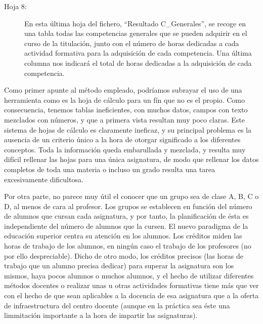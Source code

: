 \begin{description}
			\item[Hoja 8:] En esta última hoja del fichero, "`Resultado C\_Generales"', se	recoge en una tabla todas las competencias generales que se pueden adquirir en el curso de la titulación, junto con el número de horas dedicadas a cada actividad formativa para la adquisición de cada competencia. Una última columna	nos indicará el total de horas dedicadas a la adquisición de cada competencia.
		\end{description}

		Como primer apunte al método empleado, podríamos subrayar el uso de una herramienta como es la hoja de cálculo para un fín que no es el propio. Como consecuencia, tenemos tablas ineficientes, con muchos datos, campos con texto mezclados con números, y que a primera vista resultan muy poco claras. Este sistema de hojas de cálculo es claramente ineficaz, y su principal problema es la ausencia de un criterio único a la hora de otorgar significado a los diferentes conceptos. Toda la información queda embarullada y mezclada, y resulta muy difícil rellenar las hojas para una única asignatura, de modo que rellenar los datos completos de toda una materia o incluso un grado resulta una tarea excesivamente dificultosa.
     
		Por otra parte, no parece muy útil el conocer que un grupo sea de clase A, B, C o D, al menos de cara al profesor. Los grupos se establecen en función del número de alumnos que cursan cada asignatura, y por tanto, la planificación de ésta es independiente del número de alumnos que la cursen. El nuevo paradigma de la educación superior centra su atención en los alumnos. Los créditos miden las horas de trabajo de los alumnos, en ningún caso el trabajo de los profesores (no por ello despreciable). Dicho de otro modo, los créditos precisos (las horas de trabajo que un alumno precisa dedicar) para superar la asignatura son los mismos, haya pocos alumnos o muchos alumnos, y el hecho de utilizar diferentes métodos docentes o realizar unas u otras actividades formativas tiene más que ver con el hecho de que sean aplicables a la docencia de esa asignatura que a la oferta de infraestructura del centro docente (aunque en la práctica sea éste una limmitación importante a la hora de impartir las asignaturas).
      
